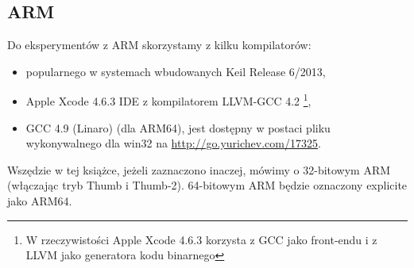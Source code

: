 \subsection{ARM}
\label{sec:hw_ARM}

\myindex{\idevices}
Do eksperymentów z ARM skorzystamy z kilku kompilatorów:

\begin{itemize}
\item popularnego w systemach wbudowanych Keil Release 6/2013,

\item Apple Xcode 4.6.3 IDE z kompilatorem LLVM-GCC 4.2
\footnote{W rzeczywistości Apple Xcode 4.6.3 korzysta z GCC jako front-endu i z LLVM jako generatora kodu binarnego},

\item GCC 4.9 (Linaro) (dla ARM64), 
jest dostępny w postaci pliku wykonywalnego dla win32 na \url{http://go.yurichev.com/17325}.

\end{itemize}

Wszędzie w tej książce, jeżeli zaznaczono inaczej, mówimy o 32-bitowym ARM (włączając tryb Thumb i Thumb-2).
64-bitowym ARM będzie oznaczony explicite jako ARM64.








